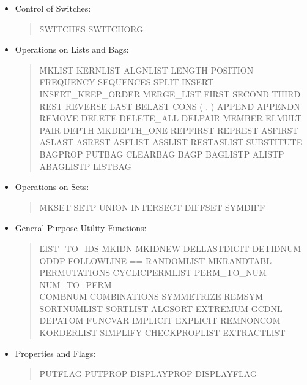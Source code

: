 \begin{itemize}
\item{Control of Switches:}
\begin{quotation}
\noindent
\f{SWITCHES SWITCHORG}
\end{quotation}
\item{Operations on Lists and Bags:}
\begin{quotation}
\noindent
\f{MKLIST KERNLIST ALGNLIST LENGTH \linebreak
POSITION FREQUENCY SEQUENCES SPLIT \linebreak
INSERT INSERT\_KEEP\_ORDER MERGE\_LIST \linebreak
FIRST SECOND THIRD REST REVERSE LAST \linebreak
BELAST CONS ( . ) APPEND APPENDN \linebreak
REMOVE DELETE DELETE\_ALL DELPAIR \linebreak
MEMBER ELMULT PAIR DEPTH MKDEPTH\_ONE \linebreak
REPFIRST REPREST ASFIRST ASLAST ASREST \linebreak
ASFLIST ASSLIST RESTASLIST SUBSTITUTE \linebreak
BAGPROP PUTBAG CLEARBAG BAGP BAGLISTP \linebreak
ALISTP ABAGLISTP LISTBAG }
\end{quotation}
\item{Operations on Sets:}
\begin{quotation}
\noindent
\f{MKSET SETP UNION INTERSECT DIFFSET SYMDIFF}
\end{quotation}
\item{General Purpose Utility Functions:}
\begin{quotation}
\noindent
\f{LIST\_TO\_IDS MKIDN MKIDNEW DELLASTDIGIT DETIDNUM \\
ODDP FOLLOWLINE  == RANDOMLIST MKRANDTABL \\
PERMUTATIONS CYCLICPERMLIST PERM\_TO\_NUM NUM\_TO\_PERM\\ 
COMBNUM COMBINATIONS SYMMETRIZE REMSYM \\
SORTNUMLIST SORTLIST ALGSORT EXTREMUM GCDNL\\
DEPATOM FUNCVAR IMPLICIT EXPLICIT REMNONCOM \\
KORDERLIST SIMPLIFY CHECKPROPLIST EXTRACTLIST} 
\end{quotation}
\item{ Properties and Flags:}
\begin{quotation}
\noindent
\f{PUTFLAG PUTPROP DISPLAYPROP DISPLAYFLAG \\
}
\end{quotation}
\end{itemize}
